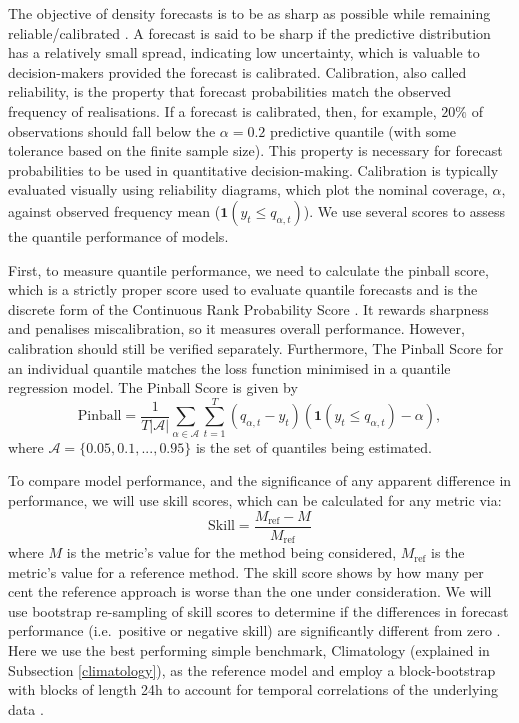 \documentclass[]{elsarticle} %
\begin{document}
The objective of density forecasts is to be as sharp as possible while remaining reliable/calibrated \citep{gneiting2007probabilistic}. A forecast is said to be sharp if the predictive distribution has a relatively small spread, indicating low uncertainty, which is valuable to decision-makers provided the forecast is calibrated. Calibration, also called reliability, is the property that forecast probabilities match the observed frequency of realisations. If a forecast is calibrated, then, for example, \(20\%\) of observations should fall below the \(\alpha=0.2\) predictive quantile (with some tolerance based on the finite sample size). This property is necessary for forecast probabilities to be used in quantitative decision-making. Calibration is typically evaluated visually using reliability diagrams, which plot the nominal coverage, \(\alpha\), against observed frequency mean (\(\mathbf{1}(y_{t}\leq q_{\alpha,t})\)). We use several scores to assess the quantile performance of models.

First, to measure quantile performance, we need to calculate the pinball score, which is a strictly proper score used to evaluate quantile forecasts and is the discrete form of the Continuous Rank Probability Score \citep{hyndman2021forecasting}. It rewards sharpness and penalises miscalibration, so it measures overall performance. However, calibration should still be verified separately. Furthermore, The Pinball Score for an individual quantile matches the loss function minimised in a quantile regression model. The Pinball Score is given by
\begin{equation}
    \text{Pinball} = 
    \frac{1}{T|\mathcal{A}|} \sum_{\alpha \in \mathcal{A}} \sum_{t=1}^T
 \left(q_{\alpha,t} - y_{t} \right)
 \left(\mathbf{1}(y_{t}\leq q_{\alpha,t})-\alpha \right) ,
 \label{eq:pinball}
\end{equation}
where \(\mathcal{A} = \{0.05,0.1,...,0.95\}\) is the set of quantiles being estimated.

To compare model performance, and the significance of any apparent difference in performance, we will use skill scores, which can be calculated for any metric via:
\begin{equation}
  \mathrm{Skill} = \frac{M_\mathrm{ref} - M}{M_\mathrm{ref}} \label{eq:skillscore}
\end{equation}
where \(M\) is the metric's value for the method being considered, \(M_\mathrm{ref}\) is the metric's value for a reference method. The skill score shows by how many per cent the reference approach is worse than the one under consideration. We will use bootstrap re-sampling of skill scores to determine if the differences in forecast performance (i.e.~positive or negative skill) are significantly different from zero \citep{Efron1981Bootstrap}. Here we use the best performing simple benchmark, Climatology (explained in Subsection \ref{climatology}), as the reference model and employ a block-bootstrap with blocks of length 24h to account for temporal correlations of the underlying data \citep{hongyi1996bootstrapping, Bergmeir2016303}.
\end{document}
